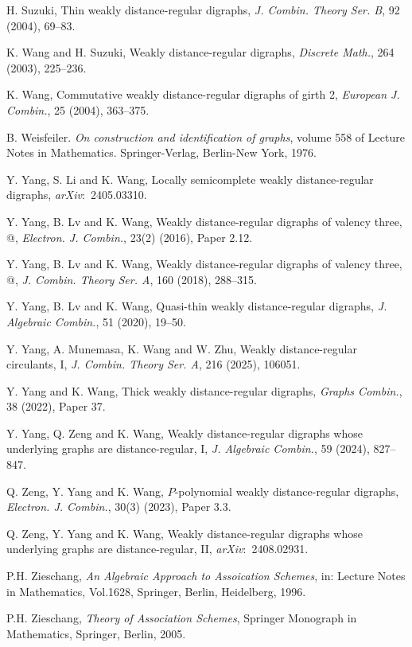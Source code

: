\documentclass[12pt,a4paper]{amsart}
\makeatletter
\newcommand{\Rmnum}[1]
{\expandafter\@slowromancap\romannumeral #1@}
\theoremstyle{definition}
\makeatother
\begin{document}
\begin{thebibliography}{00}
 H. Suzuki, Thin weakly distance-regular digraphs,
\textit{J. Combin. Theory Ser. B}, 92 (2004), 69--83.

 K. Wang and H. Suzuki, Weakly distance-regular digraphs,
\textit{Discrete Math.}, 264 (2003), 225--236.
	
 K. Wang, Commutative weakly distance-regular digraphs of girth 2,
\textit{European J. Combin.}, 25 (2004), 363--375.

 B. Weisfeiler. \textit{On construction and identification of graphs}, volume 558 of Lecture Notes in Mathematics. Springer-Verlag, Berlin-New York, 1976.

 Y. Yang, S. Li and K. Wang, Locally semicomplete weakly distance-regular digraphs, \textit{arXiv}:~2405.03310.

 Y. Yang, B. Lv and K. Wang, Weakly distance-regular digraphs of valency three, \Rmnum{1},
\textit{Electron. J. Combin.}, 23(2) (2016), Paper 2.12.
	
 Y. Yang, B. Lv and K. Wang, Weakly distance-regular digraphs of valency three, \Rmnum{2},
\textit{J. Combin. Theory Ser. A}, 160 (2018), 288--315.
	
 Y. Yang, B. Lv and K. Wang, Quasi-thin weakly distance-regular digraphs,
\textit{J. Algebraic Combin.}, 51 (2020), 19--50.

 Y. Yang, A. Munemasa, K. Wang and W. Zhu, Weakly distance-regular circulants, I,  \textit{J. Combin. Theory Ser. A}, 216 (2025), 106051.

 Y. Yang and K. Wang, Thick weakly distance-regular digraphs, \textit{Graphs Combin.}, 38 (2022), Paper 37.
	
 Y. Yang, Q. Zeng and K. Wang, Weakly distance-regular digraphs whose underlying graphs are distance-regular, I, \textit{J. Algebraic Combin.}, 59 (2024), 827--847.
	
 Q. Zeng, Y. Yang and K. Wang, $P$-polynomial weakly distance-regular digraphs, \textit{Electron. J. Combin.}, 30(3) (2023), Paper 3.3.
	
 Q. Zeng, Y. Yang  and K. Wang, Weakly distance-regular digraphs whose underlying graphs are distance-regular, II, \textit{arXiv}:~2408.02931.
	
 P.H. Zieschang, \textit{An Algebraic Approach to Assoication Schemes}, in: Lecture Notes in Mathematics, Vol.1628, Springer, Berlin, Heidelberg, 1996.
	
 P.H. Zieschang,
\textit{Theory of Association Schemes}, Springer Monograph in Mathematics, Springer, Berlin, 2005.

\end{thebibliography}
				
\end{document}
